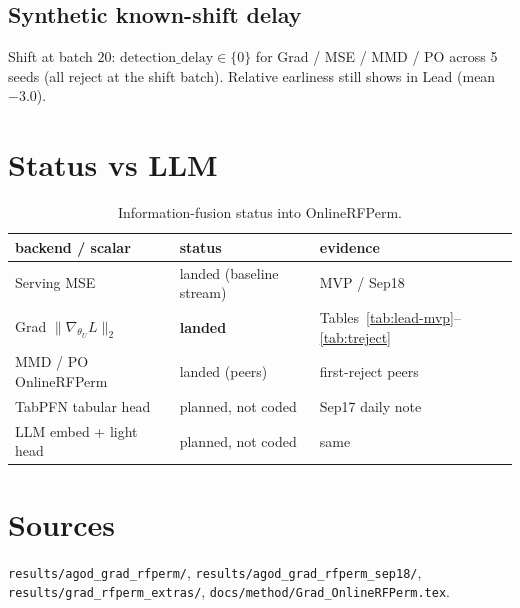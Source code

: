 \documentclass[11pt]{article}
\newcommand{\gradU}{\nabla_{\theta_U}}
\begin{document}
\subsection{Synthetic known-shift delay}
Shift at batch $20$: $\mathrm{detection\_delay}\in\{0\}$ for Grad / MSE /
MMD / PO across 5 seeds (all reject at the shift batch). Relative
earliness still shows in Lead (mean $-3.0$).

\section{Status vs LLM}
\label{sec:llm}

\begin{table}[h]
\centering
\caption{Information-fusion status into OnlineRFPerm.}
\label{tab:status}
\begin{tabular}{lll}
\toprule
backend / scalar & status & evidence \\
\midrule
Serving MSE & landed (baseline stream) & MVP / Sep18 \\
Grad $\|\gradU L\|_2$ & \textbf{landed} & Tables~\ref{tab:lead-mvp}--\ref{tab:treject} \\
MMD / PO OnlineRFPerm & landed (peers) & first-reject peers \\
TabPFN tabular head & planned, not coded & Sep17 daily note \\
LLM embed + light head & planned, not coded & same \\
\bottomrule
\end{tabular}
\end{table}

\section{Sources}
\texttt{results/agod\_grad\_rfperm/},
\texttt{results/agod\_grad\_rfperm\_sep18/},
\texttt{results/grad\_rfperm\_extras/},
\texttt{docs/method/Grad\_OnlineRFPerm.tex}.
\end{document}
